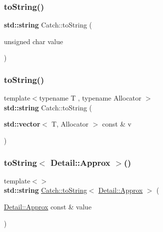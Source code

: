 \subsubsection{\texorpdfstring{to\+String()}{toString()}\hspace{0.1cm}{\footnotesize\ttfamily [16/17]}}
{\footnotesize\ttfamily \textbf{ std\+::string} Catch\+::to\+String (\begin{DoxyParamCaption}\item[{unsigned char}]{value }\end{DoxyParamCaption})}

\mbox{\label{namespace_catch_a2899237fef39daaae9a22e7846c0a9bf}} 
\subsubsection{\texorpdfstring{to\+String()}{toString()}\hspace{0.1cm}{\footnotesize\ttfamily [17/17]}}
{\footnotesize\ttfamily template$<$typename T , typename Allocator $>$ \\
\textbf{ std\+::string} Catch\+::to\+String (\begin{DoxyParamCaption}\item[{\textbf{ std\+::vector}$<$ T, Allocator $>$ const \&}]{v }\end{DoxyParamCaption})}

\mbox{\label{namespace_catch_ac501c2b6bfe82978d699ddda37c53d13}} 
\subsubsection{\texorpdfstring{to\+String$<$ Detail\+::\+Approx $>$()}{toString< Detail::Approx >()}}
{\footnotesize\ttfamily template$<$$>$ \\
\textbf{ std\+::string} \hyperlink{namespace_catch_adbd1730f961da94d9ed284f70fd7a28b}{Catch\+::to\+String}$<$ \hyperlink{class_catch_1_1_detail_1_1_approx}{Detail\+::\+Approx} $>$ (\begin{DoxyParamCaption}\item[{\hyperlink{class_catch_1_1_detail_1_1_approx}{Detail\+::\+Approx} const \&}]{value }\end{DoxyParamCaption})\hspace{0.3cm}{\ttfamily [inline]}}

